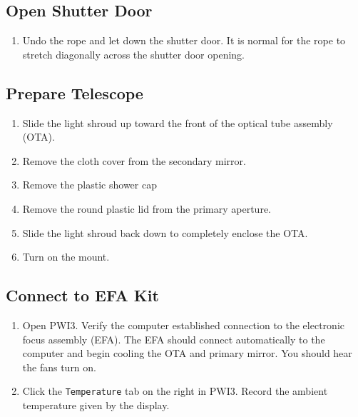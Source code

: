 \documentclass{article}
\begin{document}
	\subsection{Open Shutter Door}
	
	\begin{enumerate}
		
		\item Undo the rope and let down the shutter door. It is normal for the rope to stretch diagonally across the shutter door opening.
		
	\end{enumerate}
	
	\subsection{Prepare Telescope}
	
	\begin{enumerate}
		
		\item Slide the light shroud up toward the front of the optical tube assembly (OTA).
		
		\item Remove the cloth cover from the secondary mirror.
		
		\item Remove the plastic shower cap 
		
		\item Remove the round plastic lid from the primary aperture.
		
		\item Slide the light shroud back down to completely enclose the OTA.
		
		\item Turn on the mount.
		
	\end{enumerate}
	
	\subsection{Connect to EFA Kit}
	
	\begin{enumerate}
		
		\item Open PWI3. Verify the computer established connection to the electronic focus assembly (EFA). The EFA should connect automatically to the computer and begin cooling the OTA and primary mirror. You should hear the fans turn on.
		
		\item Click the \texttt{Temperature} tab on the right in PWI3. Record the ambient temperature given by the display.
		
	\end{enumerate}
	
\end{document}
